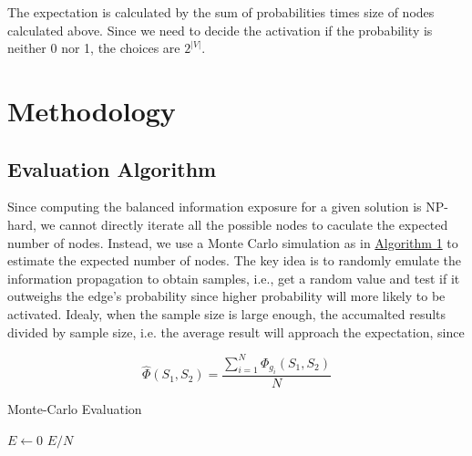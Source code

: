 \documentclass{article}
\begin{document}
The expectation is calculated by the sum of probabilities times size of nodes calculated above. Since we need to decide the activation if the probability is neither 0 nor 1, the choices are $2^{|V|}$.

\section{Methodology}

\subsection{Evaluation Algorithm}
Since computing the balanced information exposure for a given solution is NP-hard, we cannot directly iterate all the possible nodes to caculate the expected number of nodes. Instead, we use a Monte Carlo simulation as in \href{alg:monte-carlo}{Algorithm 1} to estimate the expected number of nodes. The key idea is to randomly emulate the information propagation to obtain samples, i.e., get a random value and test if it outweighs the edge's probability since higher probability will more likely to be activated. Idealy, when the sample size is large enough, the accumalted results divided by sample size, i.e. the average result will approach the expectation, since

\[
    \widehat{\Phi} \left( S_1, S_2 \right) = \frac{\sum_{i=1}^{N} \Phi_{g_i}\left(S_1, S_2\right)}{N}
\]

\begin{algorithm}
\caption{Monte-Carlo Evaluation}\label{alg:monte-carlo}
$E\leftarrow 0$\;
\Return $E/N$\;
\end{algorithm}
\end{document}
